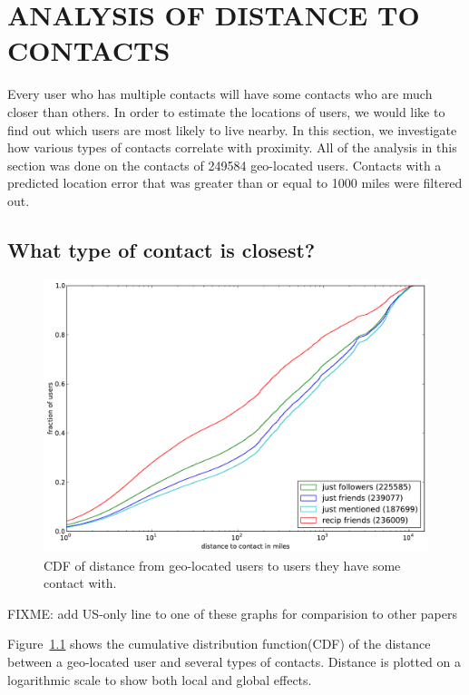 
\chapter{\uppercase{Analysis of Distance to Contacts}}

Every user who has multiple contacts will have some contacts who are much
closer than others. In order to estimate the locations of users, we would like
to find out which users are most likely to live nearby.  In this section, we
investigate how various types of contacts correlate with proximity.
All of the analysis in this section was done on the contacts of 249584 geo-located users.
Contacts with a predicted location error that was greater than or equal to 1000
miles were filtered out.

\section{What type of contact is closest?}
\label{sec:EdgeTypes}

\begin{figure}[tb]
\centering
\includegraphics[width=\linewidth]{figures/edge_types_cuml.pdf}
\caption{
CDF of distance from geo-located users to users they have some contact
with.
}
\label{fig:EdgeTypesCum}
\end{figure}

FIXME: add US-only line to one of these graphs for comparision to other papers

Figure~\ref{fig:EdgeTypesCum} shows the cumulative distribution
function(CDF) of the distance between a geo-located user and several types of
contacts.
Distance is plotted on a logarithmic scale to show both local and
global effects.

